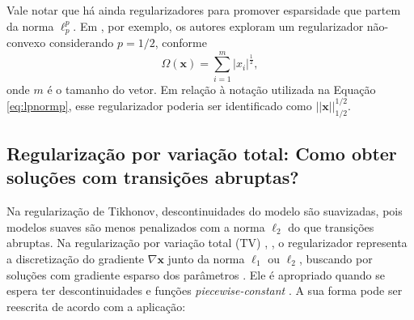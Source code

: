 Vale notar que há ainda regularizadores para promover esparsidade que partem da norma $\ell_p^p$. Em \cite{Xu2010}, por exemplo, os autores exploram um regularizador não-convexo considerando $p = 1/2$, conforme 
\begin{equation}
\Omega(\mathbf{x}) = \sum_{i=1}^{m} \vert x_i \vert^{\frac{1}{2}},
\label{eq:norma12meio}
\end{equation}
onde $m$ é o tamanho do vetor. Em relação à notação utilizada na Equação \eqref{eq:lpnormp}, esse regularizador poderia ser identificado como $\vert \vert \mathbf{x} \vert\vert_{1/2}^{1/2}$.


\subsection{Regularização por variação total: Como obter soluções com transições abruptas?}
Na regularização de Tikhonov, descontinuidades do modelo são suavizadas, pois modelos suaves são menos penalizados com a norma $\ell_2$ do que transições abruptas. Na regularização por variação total (TV) \cite[pág. 195]{aster2019parameter},  \cite{Rudin1992, Gilboa2018, Wu2010}, o regularizador representa a discretização do gradiente $ \nabla\mathbf{x}$ junto da norma $\ell_1$ ou $\ell_2$, buscando por soluções com gradiente esparso dos parâmetros \cite{Benning2018}. Ele é apropriado quando se espera ter descontinuidades e funções \textit{piecewise-constant} \cite[Seção 7.4]{aster2019parameter} \cite[Seção 6.4]{Mueller2012}. A sua forma pode ser reescrita de acordo com a aplicação:
